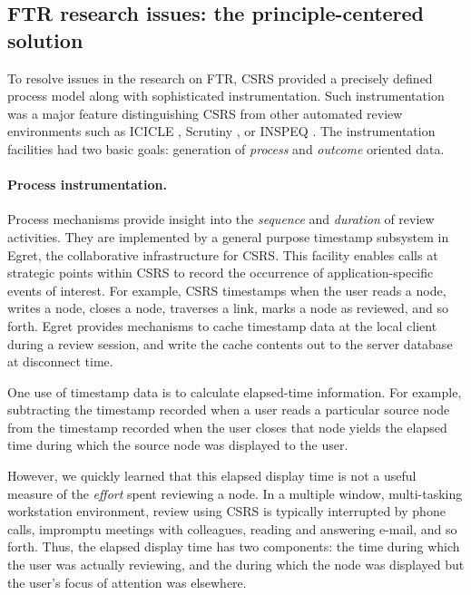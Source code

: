 \subsection{FTR research issues: the principle-centered solution}
\label{sec:instrumentation}

To resolve issues in the research on FTR, CSRS provided a precisely
defined process model along with sophisticated instrumentation.  
Such instrumentation was a major feature distinguishing CSRS from other
automated review environments such as ICICLE \cite{Brothers90}, Scrutiny
\cite{Gintell93}, or INSPEQ \cite{Knight91}. The instrumentation facilities
had two basic goals: generation of {\em process} and {\em outcome} oriented data. 


\paragraph{Process instrumentation.} 

Process mechanisms provide insight into the {\em sequence}\/ and {\em
duration}\/ of review activities.  They are implemented by a general
purpose timestamp subsystem in Egret, the collaborative infrastructure for
CSRS.  This facility enables calls at strategic points within CSRS to
record the occurrence of application-specific events of interest. For
example, CSRS timestamps when the user reads a node, writes a node, closes
a node, traverses a link, marks a node as reviewed, and so forth.  Egret
provides mechanisms to cache timestamp data at the local client during a
review session, and write the cache contents out to the server database at
disconnect time.

One use of timestamp data is to calculate elapsed-time
information.  For example, subtracting the timestamp recorded when a
user reads a particular source node from the timestamp recorded when
the user closes that node yields the elapsed time during which the
source node was displayed to the user.

However, we quickly learned that this elapsed display time is not a useful
measure of the {\em effort} spent reviewing a node.  In a multiple window,
multi-tasking workstation environment, review using CSRS is typically
interrupted by phone calls, impromptu meetings with colleagues, reading and
answering e-mail, and so forth. Thus, the elapsed display time has two
components: the time during which the user was actually reviewing, and the
during which the node was displayed but the user's focus of attention was
elsewhere.

